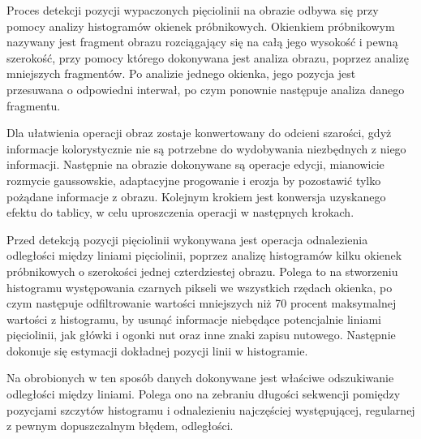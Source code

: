 Proces detekcji pozycji wypaczonych pięciolinii na obrazie odbywa się przy pomocy analizy histogramów okienek próbnikowych. Okienkiem próbnikowym nazywany jest fragment obrazu rozciągający się na całą jego wysokość i pewną szerokość, przy pomocy którego dokonywana jest analiza obrazu, poprzez analizę mniejszych fragmentów. Po analizie jednego okienka, jego pozycja jest przesuwana o odpowiedni interwał, po czym ponownie następuje analiza danego fragmentu.

Dla ułatwienia operacji obraz zostaje konwertowany do odcieni szarości, gdyż informacje kolorystycznie nie są potrzebne do wydobywania niezbędnych z niego informacji. Następnie na obrazie dokonywane są operacje edycji, mianowicie rozmycie gaussowskie, adaptacyjne progowanie i erozja by pozostawić tylko pożądane informacje z obrazu. Kolejnym krokiem jest konwersja uzyskanego efektu do tablicy, w celu uproszczenia operacji w następnych krokach. 

Przed detekcją pozycji pięciolinii wykonywana jest operacja odnalezienia odległości między liniami pięciolinii, poprzez analizę histogramów kilku okienek próbnikowych o szerokości jednej czterdziestej obrazu. Polega to na stworzeniu histogramu występowania czarnych pikseli we wszystkich rzędach okienka, po czym następuje odfiltrowanie wartości mniejszych niż 70 procent maksymalnej wartości z histogramu, by usunąć informacje niebędące potencjalnie liniami pięciolinii, jak główki i ogonki nut oraz inne znaki zapisu nutowego. Następnie dokonuje się estymacji dokładnej pozycji linii w histogramie.

Na obrobionych w ten sposób danych dokonywane jest właściwe odszukiwanie odległości między liniami. Polega ono na zebraniu długości sekwencji pomiędzy pozycjami szczytów histogramu i odnalezieniu najczęściej występującej, regularnej z pewnym dopuszczalnym błędem, odległości.

